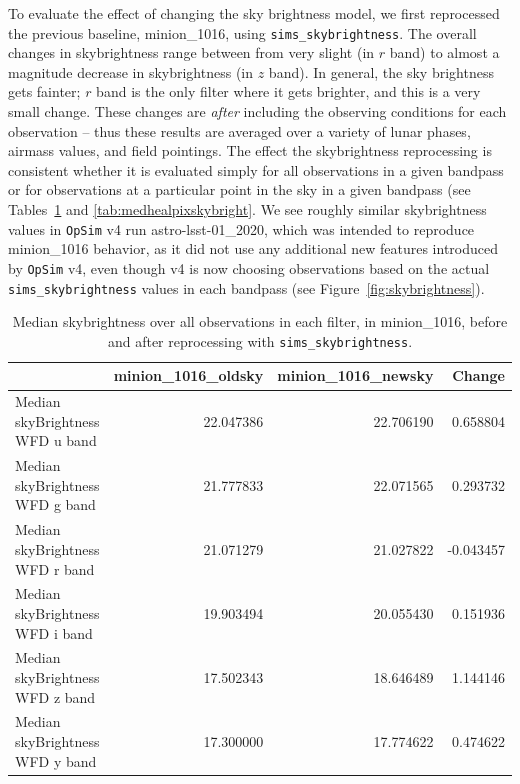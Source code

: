 \documentclass[DM,lsstdraft,authoryear,toc]{lsstdoc}
\newcommand{\opsim}{\texttt{OpSim}\xspace}
\newcommand{\simsky}{\texttt{sims\_skybrightness}\xspace}
\begin{document}
To evaluate the effect of changing the sky brightness model, we first reprocessed the previous baseline, minion\_1016, using \simsky. The overall changes in skybrightness range between from very slight (in $r$ band) to almost a magnitude decrease in skybrightness (in $z$ band). In general, the sky brightness gets fainter; $r$ band is the only filter where it gets brighter, and this is a very small change. These changes are {\it after} including the observing conditions for each observation -- thus these results are averaged over a variety of lunar phases, airmass values, and field pointings. The effect the skybrightness reprocessing is consistent whether it is evaluated simply for all observations in a given bandpass or  for observations at a particular point in the sky in a given bandpass (see Tables~\ref{tab:medskybright} and \ref{tab:medhealpixskybright}. We see roughly similar skybrightness values in \opsim v4 run astro-lsst-01\_2020, which was intended to reproduce minion\_1016 behavior, as it did not use any additional new features introduced by \opsim v4, even though v4 is now choosing observations based on the actual \simsky values in each bandpass (see Figure~\ref{fig:skybrightness}). 

\begin{table}[htp]
\caption{Median skybrightness over all observations in each filter, in minion\_1016, before and after reprocessing with \simsky.}
\begin{center}
\begin{tabular}{lrrr}
{} &  minion\_1016\_oldsky &  minion\_1016\_newsky &    Change \\
\hline
Median skyBrightness WFD u band       &           22.047386 &           22.706190 &  0.658804 \\
Median skyBrightness WFD g band       &           21.777833 &           22.071565 &  0.293732 \\
Median skyBrightness WFD r band       &           21.071279 &           21.027822 & -0.043457 \\
Median skyBrightness WFD i band       &           19.903494 &           20.055430 &  0.151936 \\
Median skyBrightness WFD z band       &           17.502343 &           18.646489 &  1.144146 \\
Median skyBrightness WFD y band       &           17.300000 &           17.774622 &  0.474622 \\
\hline
\end{tabular}
\end{center}
\label{tab:medskybright}
\end{table}
\end{document}
